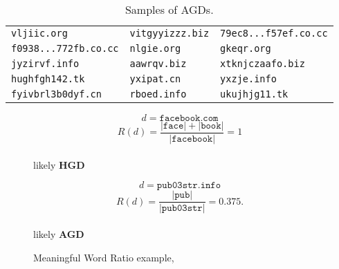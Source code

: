 \begin{table}[!htp]
    \centering
    \begin{tabular}{lll}
        \verb+vljiic.org+           & \verb+vitgyyizzz.biz+ & \verb+79ec8...f57ef.co.cc+ \\
        \verb+f0938...772fb.co.cc+  & \verb+nlgie.org+      & \verb+gkeqr.org+ \\
        \verb+jyzirvf.info+         & \verb+aawrqv.biz+     & \verb+xtknjczaafo.biz+ \\
        \verb+hughfgh142.tk+        & \verb+yxipat.cn+      & \verb+yxzje.info+ \\
        \verb+fyivbrl3b0dyf.cn+     & \verb+rboed.info+     & \verb+ukujhjg11.tk+ \\
    \end{tabular}
    \caption{Samples of AGDs.}
    \label{tab:agd_sample}
\end{table}

\begin{figure}[!htp]
    \begin{minipage}{0.5\linewidth}
        \centering
        $$ d = \mathtt{facebook.com}$$\vspace{-0.2cm}
        $$R(d) = \frac{|\mathtt{face}| +|\mathtt{book}|}{|\mathtt{facebook}|} = 1$$
        \vspace{0.3cm} \\ likely \bfseries{HGD}
        \end{minipage}\begin{minipage}{0.5\linewidth}
        \centering
        $$ d = \mathtt{pub03str.info}$$\vspace{-0.2cm}
        $$R(d) = \frac{|\mathtt{pub}|}{|\mathtt{pub03str}|} = 0.375.$$
        \vspace{0.3cm} \\ likely \bfseries{AGD}
    \end{minipage}
    \caption{Meaningful Word Ratio example, \citet{schiavoni2013}}
    \label{fig:words_ratio}
\end{figure}

